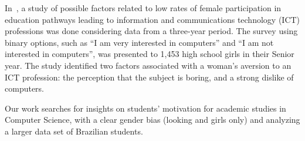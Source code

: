 In~\cite{anderson_because_2008}, a study of possible factors related to low rates of female participation in education pathways leading to information and communications technology (ICT) professions was done considering data from a three-year period. The survey using binary options, such as ``I am very interested in computers'' and ``I am not interested in computers'', was presented to 1,453 high school girls in their Senior year. The study identified two factors associated with a woman's aversion to an ICT profession: the perception that the subject is boring, and a strong dislike of computers.


Our work searches for insights on students' motivation for academic studies in Computer Science, with a clear gender bias (looking and girls only) and analyzing a larger data set of Brazilian students.
